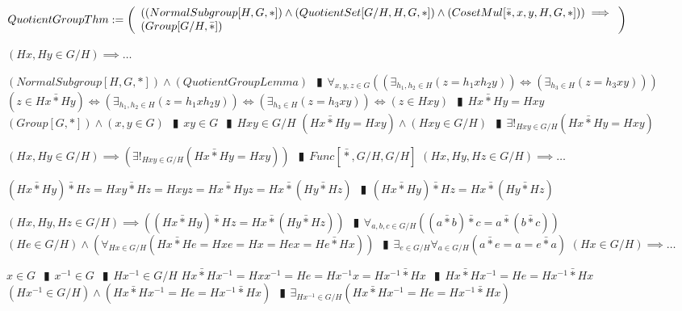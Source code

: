 \documentclass{book}
\newcommand{\abr}{:=}
\newcommand{\pipe}{$\phantom{(}\vrectangleblack\phantom{)}$}
\newcommand{\bbin}[1]{\mathbin{{\bar{#1}}}}
\begin{document}
$QuotientGroupThm \abr \left(\begin{array}{ll}
  ((NormalSubgroup[H, G, *]) \hfill \land \hfill (QuotientSet[G / H, H, G, *]) \hfill \land \hfill (CosetMul[\bbin{*}, x, y, H, G, *])) \hfill \implies \hfill \\
  (Group[G / H, \bbin{*}])
\end{array}\right)$
\begin{enumerate}
  \lit $(H x, H y \in G / H) \implies \ldots$
  \begin{enumerate}
    \lit $(NormalSubgroup[H, G, *]) \land (QuotientGroupLemma)$ \pipe $\forall_{x, y, z \in G}((\exists_{h_1, h_2 \in H}(z = h_1 x h_2 y)) \iff (\exists_{h_3 \in H}(z = h_3 x y)))$
    \lit $(z \in H x \bbin{*} H y) \iff (\exists_{h_1, h_2 \in H}(z = h_1 x h_2 y)) \iff (\exists_{h_3 \in H}(z = h_3 x y)) \iff (z \in H x y)$ \pipe $H x \bbin{*} H y = H x y$
    \lit $(Group[G, *]) \land (x, y \in G)$ \pipe $x y \in G$ \pipe $H x y \in G / H$
    \lit $(H x \bbin{*} H y = H x y) \land (H x y \in G / H)$ \pipe $\exists!_{H x y \in G / H}(H x \bbin{*} H y = H x y)$
  \end{enumerate}
  \lit $(H x, H y \in G / H) \implies (\exists!_{H x y \in G / H}(H x \bbin{*} H y = H x y))$ \pipe $Func[\bbin{*}, G / H, G / H]$
  \lit $(H x, H y, H z \in G / H) \implies \ldots$
  \begin{enumerate}
    \lit $(H x \bbin{*} H y) \bbin{*} H z = H x y \bbin{*} H z = H x y z = H x \bbin{*} H y z = H x \bbin{*} (H y \bbin{*} H z)$ \pipe $(H x \bbin{*} H y) \bbin{*} H z = H x \bbin{*} (H y \bbin{*} H z)$
  \end{enumerate}
  \lit $(H x, H y, H z \in G / H) \implies ((H x \bbin{*} H y) \bbin{*} H z = H x \bbin{*} (H y \bbin{*} H z))$ \pipe $\forall_{a, b, c \in G / H}((a \bbin{*} b) \bbin{*} c = a \bbin{*} (b \bbin{*} c))$
  \lit $(H e \in G / H) \land (\forall_{H x \in G / H}(H x \bbin{*} H e = H x e = H x = H e x = H e \bbin{*} H x))$ \pipe $\exists_{e \in G / H} \forall_{a \in G / H}(a \bbin{*} e = a = e \bbin{*} a)$
  \lit $(H x \in G / H) \implies \ldots$
  \begin{enumerate}
    \lit $x \in G$ \pipe $x^{-1} \in G$ \pipe $H x^{-1} \in G / H$
    \lit $H x \bbin{*} H x^{-1} = H x x^{-1} = H e = H x^{-1} x = H x^{-1} \bbin{*} H x$ \pipe $H x \bbin{*} H x^{-1} = H e = H x^{-1} \bbin{*} H x$
    \lit $(H x^{-1} \in G / H) \land (H x \bbin{*} H x^{-1} = H e = H x^{-1} \bbin{*} H x)$ \pipe $\exists_{H x^{-1} \in G / H}(H x \bbin{*} H x^{-1} = H e = H x^{-1} \bbin{*} H x)$
  \end{enumerate}

\end{enumerate}
\end{document}
